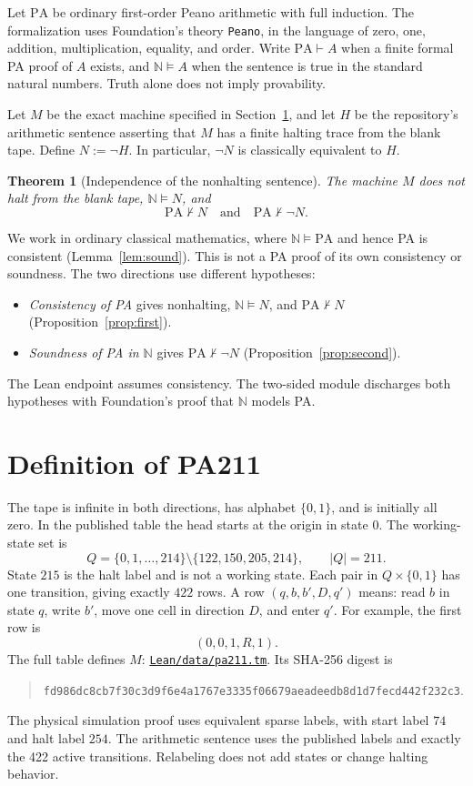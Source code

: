 \documentclass[11pt,letterpaper]{article}
\newtheorem{theorem}{Theorem}[section]
\newcommand{\PA}{\mathrm{PA}}
\newcommand{\NN}{\mathbb{N}}
\newcommand{\src}[2]{\href{https://github.com/jamesyc/BusyBeaver/blob/main/#1}{\texttt{\nolinkurl{#2}}}}
\begin{document}
Let $\PA$ be ordinary first-order Peano arithmetic with full induction.
The formalization uses Foundation's theory \texttt{Peano}, in the language
of zero, one, addition, multiplication, equality, and order.
Write $\PA\vdash A$ when a finite formal PA proof of $A$ exists, and
$\NN\models A$ when the sentence is true in the standard natural numbers.
Truth alone does not imply provability.

Let $M$ be the exact machine specified in Section~\ref{sec:machine}, and
let $H$ be the repository's arithmetic sentence asserting that $M$ has a
finite halting trace from the blank tape. Define $N:=\neg H$.
In particular, $\neg N$ is classically equivalent to $H$.

\begin{theorem}[Independence of the nonhalting sentence]\label{thm:main}
The machine $M$ does not halt from the blank tape, $\NN\models N$, and
\[
\PA\nvdash N\quad\text{and}\quad\PA\nvdash\neg N.
\]
\end{theorem}

We work in ordinary classical mathematics, where
$\NN\models\PA$ and hence PA is consistent (Lemma~\ref{lem:sound}).
This is not a PA proof of its own consistency or soundness. The two
directions use different hypotheses:
\begin{itemize}
\item \emph{Consistency of PA} gives nonhalting, $\NN\models N$, and
$\PA\nvdash N$ (Proposition~\ref{prop:first}).
\item \emph{Soundness of PA in $\NN$} gives $\PA\nvdash\neg N$
(Proposition~\ref{prop:second}).
\end{itemize}
The Lean endpoint assumes consistency. The two-sided module discharges
both hypotheses with Foundation's proof that $\NN$ models PA.

\section{Definition of PA211}\label{sec:machine}

The tape is infinite in both directions, has alphabet $\{0,1\}$, and is
initially all zero. In the published table the head starts at the origin
in state $0$. The working-state set is
\[
Q=\{0,1,\ldots,214\}\setminus\{122,150,205,214\},\qquad |Q|=211.
\]
State $215$ is the halt label and is not a working state. Each pair in
$Q\times\{0,1\}$ has one transition, giving exactly $422$ rows. A row
$(q,b,b',D,q')$ means: read $b$ in state $q$, write $b'$, move one cell in
direction $D$, and enter $q'$. For example, the first row is
\[
(0,0,1,R,1).
\]
The full table defines $M$:
\src{Lean/data/pa211.tm}{Lean/data/pa211.tm}.
Its SHA-256 digest is
\begin{quote}\small
\nolinkurl{fd986dc8cb7f30c3d9f6e4a1767e3335f06679aeadeedb8d1d7fecd442f232c3}.
\end{quote}
The physical simulation proof uses equivalent sparse labels, with
start label $74$ and halt label $254$. The arithmetic sentence uses the
published labels and exactly the 422 active transitions. Relabeling does
not add states or change halting behavior.
\end{document}
